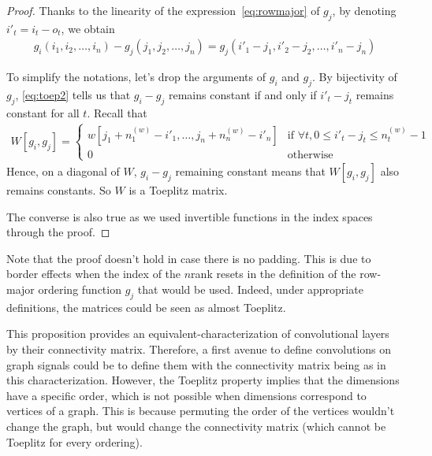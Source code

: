 \begin{proof}
Thanks to the linearity of the expression~\eqref{eq:rowmajor} of $g_j$, by denoting $i'_t = i_t - o_t$, we obtain
\begin{gather}
  g_i(i_1, i_2, \ldots, i_n) - g_j(j_1, j_2, \ldots, j_n) = g_j(i'_1 - j_1, i'_2 - j_2, \ldots, i'_n - j_n)
\label{eq:toep2}
\end{gather}

To simplify the notations, let's drop the arguments of $g_i$ and $g_j$. By bijectivity of $g_j$, \eqref{eq:toep2} tells us that $g_i - g_j$ remains constant if and only if $i'_t - j_t$ remains constant for all $t$. Recall that 
\begin{gather}
  W[g_i,g_j] =
 \begin{cases}
   w[j_1 + n_1^{(w)} - i'_1, \ldots, j_n + n_n^{(w)} - i'_n] & \text{if } \forall t, 0 \le i'_t - j_t \le n_t^{(w)} - 1 \\
   0 & \text{otherwise}
 \end{cases}
\label{eq:toep3}
\end{gather}
Hence, on a diagonal of $W$, $g_i - g_j$ remaining constant means that $W[g_i,g_j]$ also remains constants. So $W$ is a Toeplitz matrix.

The converse is also true as we used invertible functions in the index spaces through the proof.
\end{proof}

\begin{remark}
Note that the proof doesn't hold in case there is no padding. This is due to border effects when the index of the $n$\powth rank resets in the definition of the row-major ordering function $g_j$ that would be used. Indeed, under appropriate definitions, the matrices could be seen as almost Toeplitz.
\end{remark}

This proposition provides an equivalent-characterization of convolutional layers by their connectivity matrix. Therefore, a first avenue to define convolutions on graph signals could be to define them with the connectivity matrix being as in this characterization. However, the Toeplitz property implies that the dimensions have a specific order, which is not possible when dimensions correspond to vertices of a graph. This is because permuting the order of the vertices wouldn't change the graph, but would change the connectivity matrix (which cannot be Toeplitz for every ordering).


